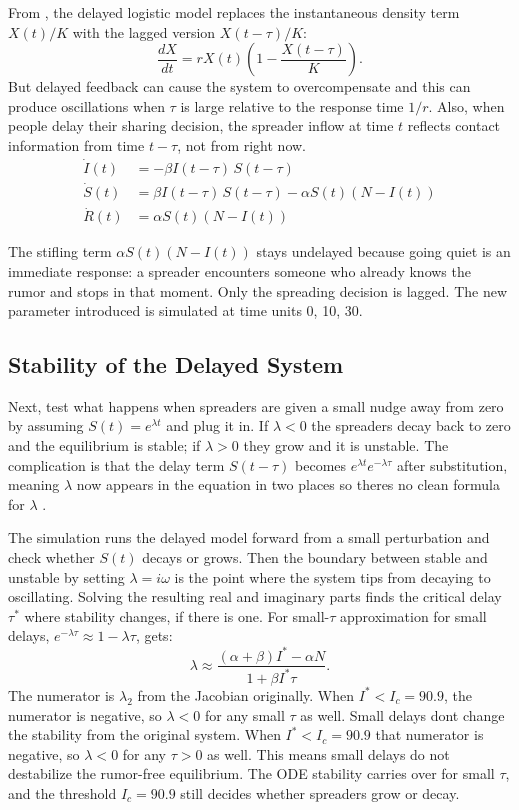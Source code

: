\documentclass[12pt]{article}
\begin{document}
From \cite{bf}, the delayed logistic model replaces
the instantaneous density term $X(t)/K$ with the lagged version
$X(t-\tau)/K$:
$$\frac{dX}{dt} = rX(t)\left(1 - \frac{X(t-\tau)}{K}\right).$$
But delayed feedback can cause
the system to overcompensate and this can produce oscillations when $\tau$ is large
relative to the response time $1/r$. Also, when people delay their sharing decision, the spreader inflow at time $t$
reflects contact information from time $t - \tau$, not from right now.
\begin{align*}
\dot{I}(t) &= -\beta I(t-\tau)\, S(t-\tau) \\
\dot{S}(t) &= \beta I(t-\tau)\, S(t-\tau) - \alpha S(t)(N - I(t)) \\
\dot{R}(t) &= \alpha S(t)(N - I(t))
\end{align*}

The stifling term $\alpha S(t)(N - I(t))$ stays undelayed because going
quiet is an immediate response: a spreader encounters someone who already
knows the rumor and stops in that moment. Only the spreading decision is
lagged.  The
new parameter introduced is simulated at time units 0, 10, 30.
\subsection{Stability of the Delayed System}
Next, test what happens when
spreaders are given a small nudge away from zero by assuming $S(t) = e^{\lambda t}$ and plug it in. If
$\lambda < 0$ the spreaders decay back to zero and the equilibrium is stable; if $\lambda > 0$ they grow and it is unstable. The complication is that the delay term $S(t - \tau)$ becomes
$e^{\lambda t} e^{-\lambda\tau}$ after substitution, meaning $\lambda$ now
appears in the equation in two places so theres no clean formula for $\lambda$ \cite{bf}.

The simulation runs the delayed model forward from a small perturbation and check whether $S(t)$ decays or grows.
Then the boundary between stable and unstable by setting
$\lambda = i\omega$ is the point where the
system tips from decaying to oscillating. Solving the resulting real and
imaginary parts finds the critical delay $\tau^*$ where
stability changes, if there is one. For small-$\tau$ approximation
for small delays, $e^{-\lambda\tau} \approx 1 - \lambda\tau$, gets:
$$\lambda \approx \frac{(\alpha+\beta)I^* - \alpha N}{1 + \beta I^* \tau}.$$
The numerator is $\lambda_2$ from the Jacobian originally. When $I^* < I_c = 90.9$, the numerator is negative, so
$\lambda < 0$ for any small $\tau$ as well. Small delays dont change the
stability from the original system. When $I^* < I_c = 90.9$ that numerator is
negative, so $\lambda < 0$ for any $\tau > 0$ as well. This means small
delays do not destabilize the rumor-free equilibrium. The ODE stability carries over for small $\tau$, and the threshold
$I_c = 90.9$ still decides whether spreaders grow or decay.
\end{document}
